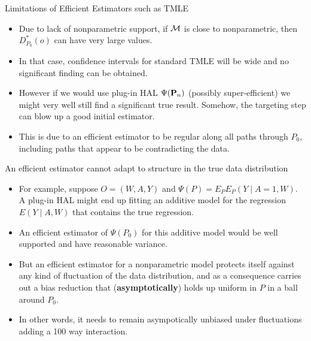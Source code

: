 \documentclass[t]{beamer}
\begin{document}
\begin{frame}{Limitations of Efficient Estimators such as TMLE}
\begin{itemize}
\item Due to lack of nonparametric support, if ${\cal M}$ is close to nonparametric, then
$D^*_{P_0}(o)$ can have very large values.
\item In that case, confidence intervals for standard TMLE will be wide and no significant finding can be obtained.
\item However if we would use plug-in HAL $\Psi({\bf P}_n)$ (possibly super-efficient) we might very well still find a significant true result. Somehow, the targeting step can blow up a good initial estimator.
\item This is due to an efficient estimator to be regular along all paths through $P_0$, including paths that appear to be contradicting the data.
\end{itemize}
\end{frame}

\begin{frame}{An efficient estimator cannot adapt to structure in the true data distribution}
\begin{itemize}
\item For example, suppose $O=(W,A,Y)$ and $\Psi(P)=E_PE_P(Y\mid A=1,W)$. A plug-in HAL might end up fitting an additive model for the regression $E(Y\mid A,W)$ that contains the true regression.
\item An efficient estimator of $\Psi(P_0)$ for this additive model would be well supported and have reasonable variance.
\item But an efficient estimator for a nonparametric model protects itself against any kind of fluctuation of the data distribution, and as a consequence carries out a bias reduction that ({\bf asymptotically}) holds up uniform in $P$ in a ball around $P_0$.
\item In other words, it needs to remain asympotically unbiased under fluctuations adding a 100 way interaction.
\end{itemize}
\end{frame}
\end{document}
